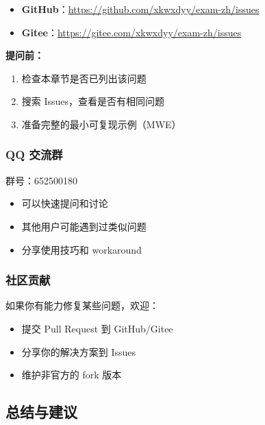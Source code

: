 \begin{itemize}
  \item \textbf{GitHub}：\url{https://github.com/xkwxdyy/exam-zh/issues}
  \item \textbf{Gitee}：\url{https://gitee.com/xkwxdyy/exam-zh/issues}
\end{itemize}

\textbf{提问前：}

\begin{enumerate}
  \item 检查本章节是否已列出该问题
  \item 搜索 Issues，查看是否有相同问题
  \item 准备完整的最小可复现示例（MWE）
\end{enumerate}

\subsubsection{QQ 交流群}

群号：652500180

\begin{itemize}
  \item 可以快速提问和讨论
  \item 其他用户可能遇到过类似问题
  \item 分享使用技巧和 workaround
\end{itemize}

\subsubsection{社区贡献}

如果你有能力修复某些问题，欢迎：

\begin{itemize}
  \item 提交 Pull Request 到 GitHub/Gitee
  \item 分享你的解决方案到 Issues
  \item 维护非官方的 fork 版本
\end{itemize}


\subsection{总结与建议}

